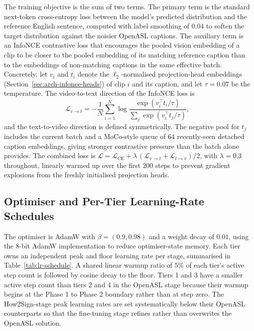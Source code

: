 \documentclass{article}
\begin{document}
The training objective is the sum of two terms. The primary term is the
standard next-token cross-entropy loss between the model's predicted
distribution and the reference English sentence, computed with label
smoothing of $0.04$ to soften the target distribution against the noisier
OpenASL captions. The auxiliary term is an InfoNCE contrastive loss that
encourages the pooled vision embedding of a clip to be closer to the pooled
embedding of its matching reference caption than to the embeddings of
non-matching captions in the same effective batch. Concretely, let $v_i$
and $t_i$ denote the $\ell_2$-normalised projection-head embeddings
(Section~\ref{sec:arch-infonce-heads}) of clip $i$ and its caption, and let
$\tau = 0.07$ be the temperature. The video-to-text direction of the
InfoNCE loss is
\[
\mathcal{L}_{v \to t} = -\frac{1}{N} \sum_{i=1}^{N}
\log \frac{\exp(v_i^\top t_i / \tau)}
         {\sum_{j} \exp(v_i^\top t_j / \tau)},
\]
and the text-to-video direction is defined symmetrically. The negative pool
for $t_j$ includes the current batch and a MoCo-style queue of $64$
recently-seen detached caption embeddings, giving stronger contrastive
pressure than the batch alone provides. The combined loss is
$\mathcal{L} = \mathcal{L}_{\text{CE}} + \lambda \,
(\mathcal{L}_{v \to t} + \mathcal{L}_{t \to v}) / 2$, with
$\lambda = 0.3$ throughout, linearly warmed up over the first $200$ steps to
prevent gradient explosions from the freshly initialised projection heads.

\subsection{Optimiser and Per-Tier Learning-Rate Schedules}
\label{sec:train-optim}

The optimiser is AdamW with $\beta = (0.9, 0.98)$ and a weight decay of
$0.01$, using the 8-bit AdamW implementation to reduce optimiser-state
memory. Each tier owns an independent peak and floor learning rate per
stage, summarised in Table~\ref{tab:lr-schedule}. A shared linear warmup
ratio of $5\%$ of each tier's active step count is followed by cosine decay
to the floor. Tiers 1 and 3 have a smaller active step count than tiers 2
and 4 in the OpenASL stage because their warmup begins at the Phase 1 to
Phase 2 boundary rather than at step zero. The How2Sign-stage peak learning
rates are set systematically below their OpenASL counterparts so that the
fine-tuning stage refines rather than overwrites the OpenASL solution.
\end{document}
